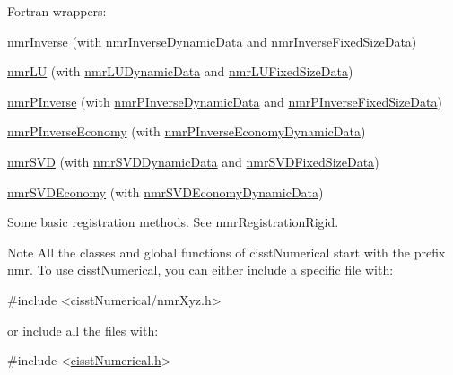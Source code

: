 \begin{DoxyItemize}
\begin{DoxyItemize}
\item Fortran wrappers\+: 
\begin{DoxyItemize}
\item \hyperlink{nmr_inverse_8h_a018d876444a46377abdd85e296643035}{nmr\+Inverse} (with \hyperlink{classnmr_inverse_dynamic_data}{nmr\+Inverse\+Dynamic\+Data} and \hyperlink{classnmr_inverse_fixed_size_data}{nmr\+Inverse\+Fixed\+Size\+Data}) 
\item \hyperlink{nmr_l_u_8h_a66bf403c705953a781e940cf1b674d5f}{nmr\+L\+U} (with \hyperlink{classnmr_l_u_dynamic_data}{nmr\+L\+U\+Dynamic\+Data} and \hyperlink{classnmr_l_u_fixed_size_data}{nmr\+L\+U\+Fixed\+Size\+Data}) 
\item \hyperlink{nmr_p_inverse_8h_a0694f8540c064c2aa6d8dbe488238462}{nmr\+P\+Inverse} (with \hyperlink{classnmr_p_inverse_dynamic_data}{nmr\+P\+Inverse\+Dynamic\+Data} and \hyperlink{classnmr_p_inverse_fixed_size_data}{nmr\+P\+Inverse\+Fixed\+Size\+Data}) 
\item \hyperlink{nmr_p_inverse_economy_8h_af93b2c1c9b8517e63053a1f6c18f8952}{nmr\+P\+Inverse\+Economy} (with \hyperlink{classnmr_p_inverse_economy_dynamic_data}{nmr\+P\+Inverse\+Economy\+Dynamic\+Data}) 
\item \hyperlink{nmr_s_v_d_8h_a52115d0e7a485c4494aa20f4f3f4ebe7}{nmr\+S\+V\+D} (with \hyperlink{classnmr_s_v_d_dynamic_data}{nmr\+S\+V\+D\+Dynamic\+Data} and \hyperlink{classnmr_s_v_d_fixed_size_data}{nmr\+S\+V\+D\+Fixed\+Size\+Data}) 
\item \hyperlink{nmr_s_v_d_economy_8h_a7a5496ff2d20946e8738baac82318603}{nmr\+S\+V\+D\+Economy} (with \hyperlink{classnmr_s_v_d_economy_dynamic_data}{nmr\+S\+V\+D\+Economy\+Dynamic\+Data}) 
\end{DoxyItemize}
\end{DoxyItemize}
\item Some basic registration methods. See nmr\+Registration\+Rigid.
\end{DoxyItemize}

\begin{DoxyNote}{Note}
All the classes and global functions of cisst\+Numerical start with the prefix nmr. To use cisst\+Numerical, you can either include a specific file with\+: 
\begin{DoxyCode}
\textcolor{preprocessor}{#include <cisstNumerical/nmrXyz.h>}
\end{DoxyCode}
 or include all the files with\+: 
\begin{DoxyCode}
\textcolor{preprocessor}{#include <\hyperlink{cisst_numerical_8h}{cisstNumerical.h}>}
\end{DoxyCode}
 
\end{DoxyNote}


